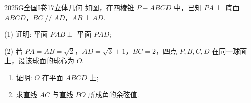 
\begin{problem}{2025}{G}{全国I卷}{17}{立体几何}
如图，在四棱锥 $P-ABCD$ 中，已知 $PA \perp$ 底面 $ABCD$，$BC \mathop{//} AD$，$AB \perp AD$.

(1) 证明: 平面 $PAB \perp$ 平面 $PAD$;

(2) 若 $PA=AB=\sqrt{2}$，$AD=\sqrt{3}+1$，$BC=2$，四点 $P,B,C,D$ 在同一球面上，设该球面的球心为 $O$.
\begin{enumerate}
\item 证明: $O$ 在平面 $ABCD$ 上;
\item 求直线 $AC$ 与直线 $PO$ 所成角的余弦值.
\end{enumerate}
\end{problem}